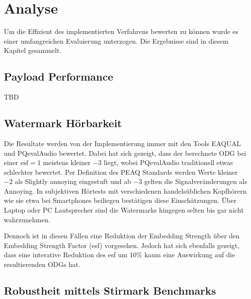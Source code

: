 \chapter{Analyse}
\label{ch:analyse}

Um die Effizient des implementierten Verfahrens bewerten zu können wurde es einer umfangreichen Evaluierung unterzogen. Die Ergebnisse sind in diesem Kapitel gesammelt. 

\section{Payload Performance}
\label{sec:payloadperformance}

TBD

\section{Watermark Hörbarkeit}

Die Resultate werden von der Implementierung immer mit den Tools EAQUAL und PQevalAudio bewertet. Dabei hat sich gezeigt, dass der berechnete ODG bei einer $\mbox{esf}=1$ meistens kleiner $-3$ liegt, wobei PQevalAudio traditionell etwas schlechter bewertet. Per Definition des PEAQ Standards werden Werte kleiner $-2$ als \glqq{}Slightly annoying\grqq{} eingestuft und ab $-3$ gelten die Signalveränderungen als \glqq{}Annoying\grqq{}. In subjektiven Hörtests mit verschiedenen handelsüblichen Kopfhörern wie sie etwa bei Smartphones beiliegen bestätigen diese Einschätzungen. Über Laptop oder PC Lautsprecher sind die Watermarks hingegen selten bis gar nicht wahrzunehmen. 

Dennoch ist in diesen Fällen eine Reduktion der Embedding Strength über den Embedding Strength Factor (esf) vorgesehen. Jedoch hat sich ebenfalls gezeigt, dass eine interative Reduktion des esf um 10\% kaum eine Auswirkung auf die resultierenden ODGs hat.

\section{Robustheit mittels Stirmark Benchmarks}

